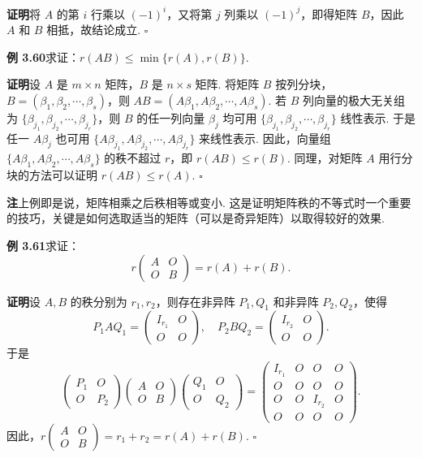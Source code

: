 \documentclass[UTF8, 12pt, fontset=fandol, oneside]{ctexart}
\begin{document}
\noindent\textbf{证明}\quad 将 $A$ 的第 $i$ 行乘以 $(-1)^i$，又将第 $j$ 列乘以 $(-1)^j$，即得矩阵 $B$，因此 $A$ 和 $B$ 相抵，故结论成立. $\square$

\noindent\textbf{例 3.60}\quad 求证：$r(AB)\le \min\{r(A),r(B)\}$.

\noindent\textbf{证明}\quad 设 $A$ 是 $m\times n$ 矩阵，$B$ 是 $n\times s$ 矩阵. 将矩阵 $B$ 按列分块，$B=(\beta_1,\beta_2,\cdots,\beta_s)$，则 $AB=(A\beta_1,A\beta_2,\cdots,A\beta_s)$. 若 $B$ 列向量的极大无关组为 $\{\beta_{j_1},\beta_{j_2},\cdots,\beta_{j_r}\}$，则 $B$ 的任一列向量 $\beta_j$ 均可用 $\{\beta_{j_1},\beta_{j_2},\cdots,\beta_{j_r}\}$ 线性表示. 于是任一 $A\beta_j$ 也可用 $\{A\beta_{j_1},A\beta_{j_2},\cdots,A\beta_{j_r}\}$ 来线性表示. 因此，向量组 $\{A\beta_1,A\beta_2,\cdots,A\beta_s\}$ 的秩不超过 $r$，即 $r(AB)\le r(B)$. 同理，对矩阵 $A$ 用行分块的方法可以证明 $r(AB)\le r(A)$. $\square$

\noindent\textbf{注}\quad 上例即是说，矩阵相乘之后秩相等或变小. 这是证明矩阵秩的不等式时一个重要的技巧，关键是如何选取适当的矩阵（可以是奇异矩阵）以取得较好的效果.

\noindent\textbf{例 3.61}\quad 求证：
\[
r\begin{pmatrix}A&O\\O&B\end{pmatrix}=r(A)+r(B).
\]

\noindent\textbf{证明}\quad 设 $A,B$ 的秩分别为 $r_1,r_2$，则存在非异阵 $P_1,Q_1$ 和非异阵 $P_2,Q_2$，使得
\[
P_1AQ_1=\begin{pmatrix}I_{r_1}&O\\O&O\end{pmatrix},\quad
P_2BQ_2=\begin{pmatrix}I_{r_2}&O\\O&O\end{pmatrix}.
\]
于是
\[
\begin{pmatrix}P_1&O\\O&P_2\end{pmatrix}
\begin{pmatrix}A&O\\O&B\end{pmatrix}
\begin{pmatrix}Q_1&O\\O&Q_2\end{pmatrix}
=
\begin{pmatrix}
I_{r_1}&O&O&O\\
O&O&O&O\\
O&O&I_{r_2}&O\\
O&O&O&O
\end{pmatrix}.
\]
因此，$r\begin{pmatrix}A&O\\O&B\end{pmatrix}=r_1+r_2=r(A)+r(B)$. $\square$
\end{document}
